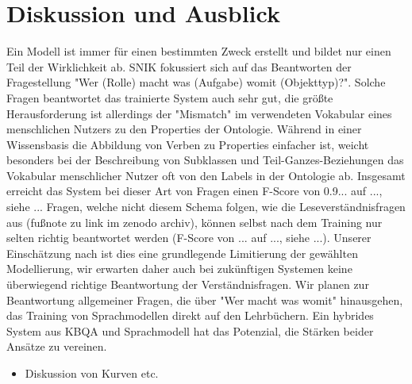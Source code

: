 \documentclass[utf8,biblatex]{lni}
\begin{document}
\section{Diskussion und Ausblick}

Ein Modell ist immer für einen bestimmten Zweck erstellt und bildet nur einen Teil der Wirklichkeit ab.
SNIK fokussiert sich auf das Beantworten der Fragestellung "Wer (Rolle) macht was (Aufgabe) womit (Objekttyp)?".
Solche Fragen beantwortet das trainierte System auch sehr gut, die größte Herausforderung ist allerdings der "Mismatch" im verwendeten Vokabular eines menschlichen Nutzers zu den Properties der Ontologie.
Während in einer Wissensbasis die Abbildung von Verben zu Properties einfacher ist, weicht besonders bei der Beschreibung von Subklassen und Teil-Ganzes-Beziehungen das Vokabular menschlicher Nutzer oft von den Labels in der Ontologie ab.
Insgesamt erreicht das System bei dieser Art von Fragen  einen F-Score von 0.9... auf ..., siehe ...
Fragen, welche nicht diesem Schema folgen, wie die Leseverständnisfragen aus \cite{bb} (fußnote zu link im zenodo archiv), können selbst nach dem Training nur selten richtig beantwortet werden (F-Score von ... auf ..., siehe ...).
Unserer Einschätzung nach ist dies eine grundlegende Limitierung der gewählten Modellierung, wir erwarten daher auch bei zukünftigen Systemen keine überwiegend richtige Beantwortung der Verständnisfragen.
Wir planen zur Beantwortung allgemeiner Fragen, die über "Wer macht was womit" hinausgehen, das Training von Sprachmodellen direkt auf den Lehrbüchern.
Ein hybrides System aus KBQA und Sprachmodell hat das Potenzial, die Stärken beider Ansätze zu vereinen.

\begin{itemize}
  \item Diskussion von Kurven etc.
\end{itemize}

\printbibliography
\end{document}
